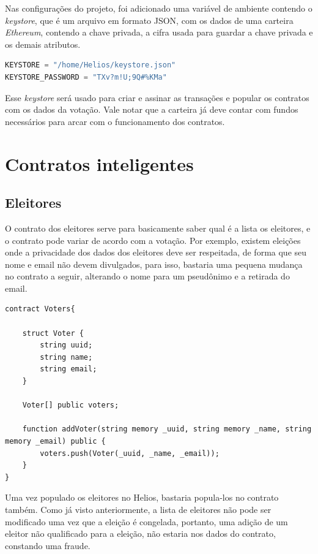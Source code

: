 \documentclass{ufsctex/ufsctex}
\begin{document}
Nas configurações do projeto, foi adicionado uma variável de ambiente contendo
o \textit{keystore}, que é um arquivo em formato JSON, com os dados de uma
carteira \textit{Ethereum}, contendo a chave privada, a cifra usada para
guardar a chave privada e os demais atributos.

\begin{lstlisting}[language=Python, numbers=none]
KEYSTORE = "/home/Helios/keystore.json"
KEYSTORE_PASSWORD = "TXv?m!U;9Q#%KMa"
\end{lstlisting}

Esse \textit{keystore} será usado para criar e assinar as transações e popular
os contratos com os dados da votação. Vale notar que a carteira já deve contar
com fundos necessários para arcar com o funcionamento dos contratos.

\section{Contratos inteligentes}

\subsection{Eleitores}

O contrato dos eleitores serve para basicamente saber qual é a lista os
eleitores, e o contrato pode variar de acordo com a votação.  Por exemplo,
existem eleições onde a privacidade dos dados dos eleitores deve ser
respeitada, de forma que seu nome e email não devem divulgados, para isso,
bastaria uma pequena mudança no contrato a seguir, alterando o nome para um
pseudônimo e a retirada do email.

\begin{lstlisting}[language=Solidity]
contract Voters{
    
    struct Voter {
        string uuid;
        string name;
        string email;
    }
    
    Voter[] public voters;
    
    function addVoter(string memory _uuid, string memory _name, string memory _email) public {
        voters.push(Voter(_uuid, _name, _email));
    }
}
\end{lstlisting}

Uma vez populado os eleitores no Helios, bastaria popula-los no contrato
também. Como já visto anteriormente, a lista de eleitores não pode ser
modificado uma vez que a eleição é congelada, portanto, uma adição de um
eleitor não qualificado para a eleição, não estaria nos dados do contrato,
constando uma fraude.
\end{document}

